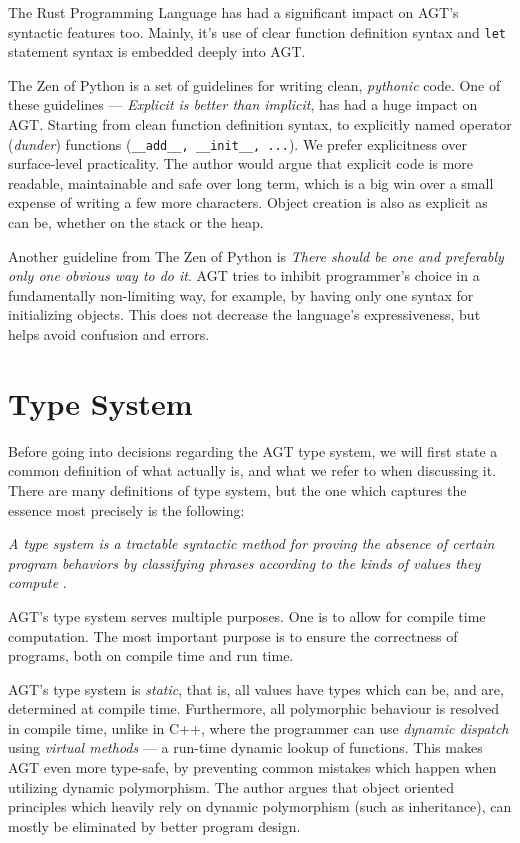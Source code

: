 \documentclass[times, utf8, diplomski]{fer}
\theoremstyle{definition}
\begin{document}
The Rust Programming Language has had a significant impact on AGT's syntactic features too.
Mainly, it's use of clear function definition syntax and \texttt{let} statement syntax is
embedded deeply into AGT.

The Zen of Python \citep{c_zen} is a set of guidelines for writing clean, \textit{pythonic} code. 
One of these guidelines --- \textit{Explicit is better than implicit}, has had a huge impact on AGT.
Starting from clean function definition syntax, to explicitly named operator (\textit{dunder}) functions
(\texttt{\_\_add\_\_, \_\_init\_\_, ...}). We prefer explicitness over surface-level practicality.
The author would argue that explicit code is more readable, maintainable and safe over long term,
which is a big win over a small expense of writing a few more characters.
Object creation is also as explicit as can be, whether on the stack or the heap.

Another guideline from The Zen of Python is 
\textit{There should be one and preferably only one obvious way to do it}. 
AGT tries to inhibit programmer's choice in a fundamentally non-limiting way, for example, by
having only one syntax for initializing objects. This does not decrease the 
language's expressiveness, but helps avoid confusion and errors.

\section{Type System}

Before going into decisions regarding the AGT type system, we will first state a common
definition of what  actually is, and what we refer to when discussing it.
There are many definitions of type system, 
but the one which captures the essence most precisely is the following:

\textit{
A type system is a tractable syntactic method for proving the absence of certain program 
behaviors by classifying phrases according to the kinds of values they compute
}\citep{c_type_system}.

AGT's type system serves multiple purposes. One is to allow for compile time computation.
The most important purpose is to ensure the correctness of programs, both on compile time and run time.

AGT's type system is \textit{static}, that is, 
all values have types which can be, and are, determined
at compile time. Furthermore, all polymorphic behaviour is resolved in compile time, unlike in C++,
where the programmer can use \textit{dynamic dispatch} using \textit{virtual methods} \citep{c_virtual} 
--- a run-time dynamic lookup of functions.
This makes AGT even more type-safe, by preventing common mistakes which happen when utilizing
dynamic polymorphism. The author argues that object oriented principles which heavily rely on
dynamic polymorphism (such as inheritance), can mostly be eliminated by better program design.
\end{document}
